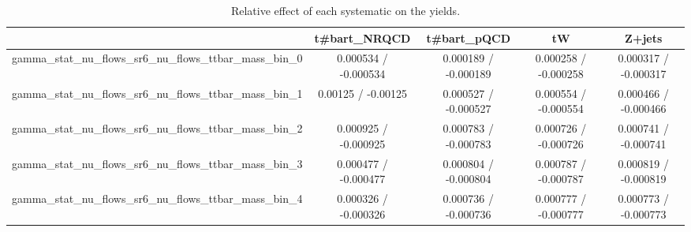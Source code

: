 \documentclass[10pt]{article}
\begin{document}
\begin{table}[htbp]
\begin{center}
\begin{tabular}{|c|c|c|c|c|}
\hline 
      & t#bar{t}_{NRQCD}      & t#bar{t}_{pQCD}      & tW      & Z+jets \\ 
\hline 
  gamma_stat_nu_flows_sr6_nu_flows_ttbar_mass_bin_0 & 0.000534 / -0.000534 & 0.000189 / -0.000189 & 0.000258 / -0.000258 & 0.000317 / -0.000317 \\ 
  gamma_stat_nu_flows_sr6_nu_flows_ttbar_mass_bin_1 & 0.00125 / -0.00125 & 0.000527 / -0.000527 & 0.000554 / -0.000554 & 0.000466 / -0.000466 \\ 
  gamma_stat_nu_flows_sr6_nu_flows_ttbar_mass_bin_2 & 0.000925 / -0.000925 & 0.000783 / -0.000783 & 0.000726 / -0.000726 & 0.000741 / -0.000741 \\ 
  gamma_stat_nu_flows_sr6_nu_flows_ttbar_mass_bin_3 & 0.000477 / -0.000477 & 0.000804 / -0.000804 & 0.000787 / -0.000787 & 0.000819 / -0.000819 \\ 
  gamma_stat_nu_flows_sr6_nu_flows_ttbar_mass_bin_4 & 0.000326 / -0.000326 & 0.000736 / -0.000736 & 0.000777 / -0.000777 & 0.000773 / -0.000773 \\ 
\hline 
\end{tabular} 
\caption{Relative effect of each systematic on the yields.} 
\end{center} 
\end{table} 
\end{document}

